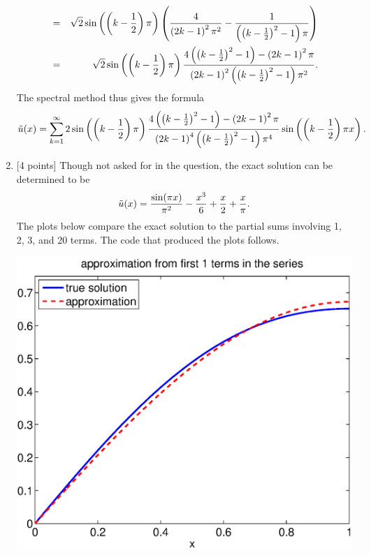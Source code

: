 \begin{solution}
\begin{enumerate}
\begin{eqnarray*}
\\
&=& \sqrt{2}\sin\left(\left(k-{1\over2}\right)\pi\right)\left({4 \over \left(2k-1\right)^2\pi^2}-{1 \over \left(\left(k-{1\over2}\right)^2-1\right)\pi}\right)
\\
&=& \sqrt{2}\sin\left(\left(k-{1\over2}\right)\pi\right){4\left(\left(k-{1\over2}\right)^2-1\right)-\left(2k-1\right)^2\pi \over \left(2k-1\right)^2\left(\left(k-{1\over2}\right)^2-1\right)\pi^2}.
\end{eqnarray*}
The spectral method thus gives the formula
\[
     \tilde{u}(x) = \sum_{k=1}^\infty 2\sin\left(\left(k-{1\over2}\right)\pi\right){4\left(\left(k-{1\over2}\right)^2-1\right)-\left(2k-1\right)^2\pi \over \left(2k-1\right)^4\left(\left(k-{1\over2}\right)^2-1\right)\pi^4}\sin\left(\left(k-{1\over2}\right)\pi x\right).
\]
\item {[4 points]} Though not asked for in the question, the exact solution can be determined to be
\[ \tilde{u}(x) = {\sin(\pi x) \over \pi^2} -{x^3 \over 6} + {x\over 2} + {x\over \pi}.\]
The plots below compare the exact solution to the partial sums involving
1, 2, 3, and 20 terms.  The code that produced the plots follows.
\begin{center}
   \includegraphics[scale=0.4]{bvps_1}\quad

\end{center}
\end{enumerate}
\end{solution}
